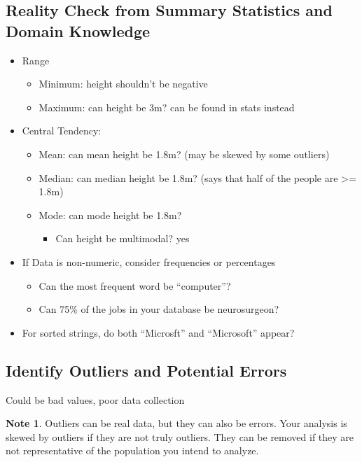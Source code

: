 \documentclass[11pt]{article}
\theoremstyle{definition}
\newtheorem{note}{Note}
\begin{document}
\subsection{Reality Check from Summary Statistics and Domain Knowledge}
\begin{itemize}
    \item Range
    \begin{itemize}
        \item Minimum: height shouldn't be negative
        \item Maximum: can height be 3m? can be found in stats instead
    \end{itemize}
    \item Central Tendency:
    \begin{itemize}
        \item Mean: can mean height be 1.8m? (may be skewed by some outliers)
        \item Median: can median height be 1.8m? (says that half of the people are >= 1.8m)
        \item Mode: can mode height be 1.8m?
        \begin{itemize}
            \item Can height be multimodal? yes
        \end{itemize}
    \end{itemize}
    \item If Data is non-numeric, consider frequencies or percentages
    \begin{itemize}
        \item Can the most frequent word be “computer”?
        \item Can 75\% of the jobs in your database be neurosurgeon?
    \end{itemize}
    \item For sorted strings, do both “Microsft” and “Microsoft” appear?
\end{itemize}

\subsection{Identify Outliers and Potential Errors}
Could be bad values, poor data collection
\begin{note}
    Outliers can be real data, but they can also be errors. Your analysis is skewed by outliers if they are not truly outliers.
    They can be removed if they are not representative of the population you intend to analyze.
\end{note}
\end{document}
